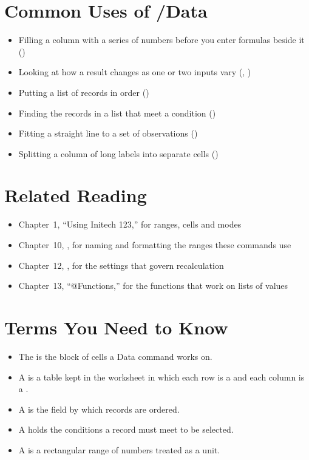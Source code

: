 \section{Common Uses of /Data}
\begin{itemize}
\item Filling a column with a series of numbers before you enter formulas beside it () 
\item Looking at how a result changes as one or two inputs vary (, ) 
\item Putting a list of records in order () 
\item Finding the records in a list that meet a condition () 
\item Fitting a straight line to a set of observations () 
\item Splitting a column of long labels into separate cells () 
\end{itemize}

\section{Related Reading}
\begin{itemize}
\item Chapter~1, ``Using Initech 123,'' for ranges, cells and modes
\item Chapter~10, , for naming and formatting the ranges these commands use
\item Chapter~12, , for the settings that govern recalculation
\item Chapter~13, ``@Functions,'' for the functions that work on lists of values
\end{itemize}

\section{Terms You Need to Know}
\begin{itemize}
\item The  is the block of cells a Data command works on.
\item A  is a table kept in the worksheet in which each row is a  and each column is a .
\item A  is the field by which records are ordered.
\item A  holds the conditions a record must meet to be selected.
\item A  is a rectangular range of numbers treated as a unit.
\end{itemize}


